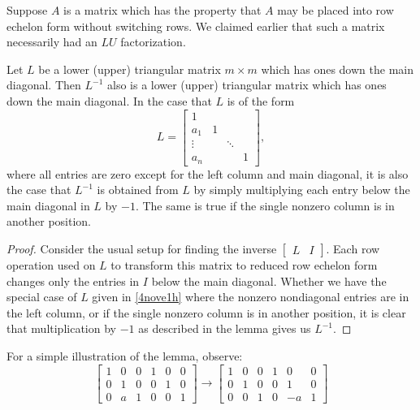 \documentclass{ximera}
\begin{document}
Suppose $A$ is a matrix which has the property that $A$ may be placed into row echelon form without switching rows.  We claimed earlier that such a matrix necessarily had an $LU$ factorization.  



\begin{lemma}\label{lem:multipliermethodtriangularmatrices}
Let $L$ be a lower (upper) triangular matrix $m\times m$
which has ones down the main diagonal. Then $L^{-1}$ also is a lower (upper)
triangular matrix which has ones down the main diagonal. In the case that $L$
is of the form
\begin{equation}
L=
\begin{bmatrix}
1 &  &  &  \\
a_{1} & 1 &  &  \\
\vdots &  & \ddots &  \\
a_{n} &  &  & 1
\end{bmatrix}, 
\end{equation}\label{4nove1h}
where all entries are zero except for the left column and main diagonal, it
is also the case that $L^{-1}$ is obtained from $L$ by simply multiplying each entry below the main diagonal in $L$ by $-1$. The same is true if the single nonzero column is in another position.
\end{lemma}

\begin{proof}Consider the usual setup for finding the inverse $\begin{bmatrix}
L & I
\end{bmatrix}$.  Each row operation used on $L$ to transform this matrix to reduced row echelon form changes only the entries in $I$ below the main diagonal. Whether we have the special case of $L$ given in \ref{4nove1h} where the nonzero nondiagonal entries are in the left column, or if the single
nonzero column is in another position, it is clear that multiplication by $-1$ as described in the lemma gives us $L^{-1}$.
\end{proof}

For a simple illustration of the lemma, observe:
\begin{equation*}
\begin{bmatrix}
1 & 0 & 0 & 1 & 0 & 0 \\
0 & 1 & 0 & 0 & 1 & 0 \\
0 & a & 1 & 0 & 0 & 1
\end{bmatrix}
\rightarrow 
\begin{bmatrix}
1 & 0 & 0 & 1 & 0 & 0 \\
0 & 1 & 0 & 0 & 1 & 0 \\
0 & 0 & 1 & 0 & -a & 1
\end{bmatrix}
\end{equation*}
\end{document}
